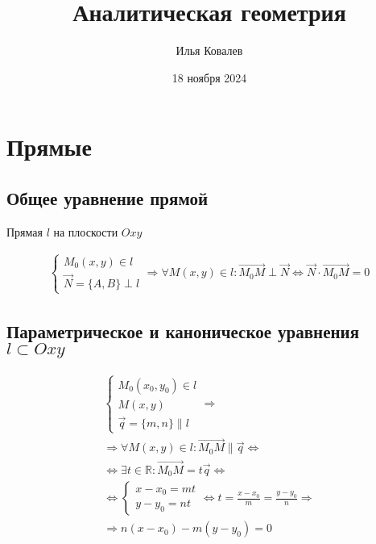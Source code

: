 \documentclass{article}
\begin{document}
\title{Аналитическая геометрия}
\author{Илья Ковалев}
\date{18 ноября 2024}
\maketitle

\section{Прямые}

\subsection{Общее уравнение прямой}

Прямая $l$ на плоскости $Oxy$

\begin{gather*}
	\begin{cases}
		M_0(x, y) \in l \\
		\vec{N} = \{ A, B \} \perp l
	\end{cases} \Rightarrow
	\forall M(x, y) \in l : \vec{M_0 M} \perp \vec{N} \Leftrightarrow \vec{N} \cdot \vec{M_0 M} = 0
\end{gather*}

\subsection{Параметрическое и каноническое уравнения \\
$l \subset Oxy$}

\begin{gather*}
	\begin{cases}
		M_0(x_0, y_0) \in l \\
		M(x, y) \\
		\vec{q} = \{ m, n \} \parallel l
	\end{cases} \Rightarrow \\
	\Rightarrow \forall M(x, y) \in l : \vec{M_0 M} \parallel \vec{q} \Leftrightarrow \\
	\Leftrightarrow \exists t \in \mathbb{R} : \vec{M_0 M} = t \vec{q} \Leftrightarrow \\
	\Leftrightarrow \begin{cases}
		x - x_0 = mt \\
		y - y_0 = nt
	\end{cases} \Leftrightarrow t = \frac{x - x_0}{m} = \frac{y - y_0}{n} \Rightarrow \\
	\Rightarrow n(x - x_0) - m(y - y_0) = 0
\end{gather*}
\end{document}
